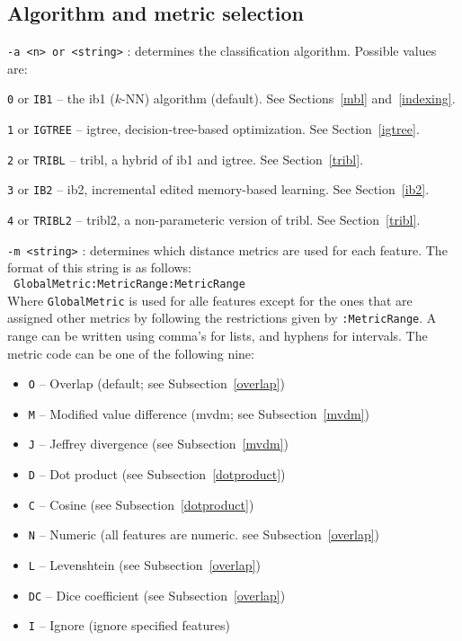 \documentclass{report}
\begin{document}
\subsection{Algorithm and metric selection}

\begin{description}

\item {\tt -a <n> or <string>} : determines the classification
algorithm. Possible values are:

	\begin{description}
	\item {\tt 0} or {\tt IB1} -- the {\sc ib1} ($k$-NN) algorithm (default). See Sections~\ref{mbl} and~\ref{indexing}.
	\item {\tt 1} or {\tt IGTREE} -- {\sc igtree}, decision-tree-based optimization. See Section~\ref{igtree}.
	\item {\tt 2} or {\tt TRIBL} -- {\sc tribl}, a hybrid of {\sc ib1} and {\sc igtree}. See Section~\ref{tribl}.
	\item {\tt 3} or {\tt IB2} -- {\sc ib2}, incremental edited memory-based learning. See Section~\ref{ib2}.
	\item {\tt 4} or {\tt TRIBL2} -- {\sc tribl2}, a non-parameteric version of {\sc tribl}. See Section~\ref{tribl}.
	\end{description}

\item {\tt -m <string>} : determines which distance metrics are used
for each feature. The format of this string is as follows:\\ {\tt
GlobalMetric:MetricRange:MetricRange}\\ Where {\tt GlobalMetric} is
used for alle features except for the ones that are assigned other
metrics by following the restrictions given by {\tt :MetricRange}.  A
range can be written using comma's for lists, and hyphens for
intervals. The metric code can be one of the following nine:

\begin{itemize}
\item {\tt O} -- Overlap (default; see Subsection~\ref{overlap})
\item {\tt M} -- Modified value difference ({\sc mvdm}; see Subsection~\ref{mvdm})
\item {\tt J} -- Jeffrey divergence (see Subsection~\ref{mvdm})
\item {\tt D} -- Dot product (see Subsection~\ref{dotproduct})
\item {\tt C} -- Cosine (see Subsection~\ref{dotproduct})
\item {\tt N} -- Numeric (all features are numeric. see Subsection~\ref{overlap})
\item {\tt L} -- Levenshtein (see Subsection~\ref{overlap})
\item {\tt DC} -- Dice coefficient (see Subsection~\ref{overlap})
\item {\tt I} -- Ignore (ignore specified features)
\end{itemize}


\end{description}
\end{document}
